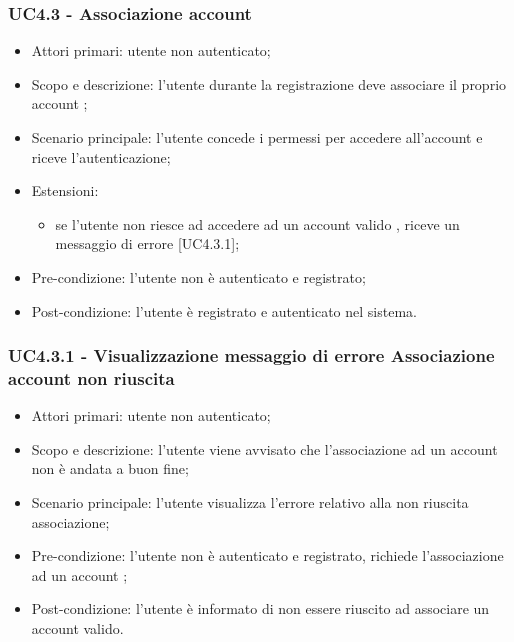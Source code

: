 \subsubsection{UC4.3 - Associazione account }
\begin{itemize}
	\item  Attori primari: utente non autenticato;
	\item  Scopo e descrizione: l'utente durante la registrazione deve associare il proprio account \markg{Amazon};
	\item  Scenario principale: l'utente concede i permessi per accedere all'account  e riceve l'autenticazione;
		\item  Estensioni:
		   \begin{itemize}
				\item se l'utente non riesce ad accedere ad un account  valido , riceve un messaggio di errore [UC4.3.1];
		   \end{itemize}
	\item  Pre-condizione: l'utente non è autenticato e registrato;
	\item  Post-condizione: l'utente è registrato e autenticato nel sistema.
\end{itemize}
\subsubsection{UC4.3.1 - Visualizzazione messaggio di errore Associazione account  non riuscita}
\begin{itemize}
	\item  Attori primari: utente non autenticato;
	\item  Scopo e descrizione: l'utente viene avvisato che l'associazione ad un account  non è andata a buon fine;
	\item  Scenario principale: l'utente visualizza l'errore relativo alla non riuscita associazione;
	\item  Pre-condizione: l'utente non è autenticato e registrato, richiede l'associazione ad un account ;
	\item  Post-condizione: l'utente è informato di non essere riuscito ad associare un account  valido.
\end{itemize}
